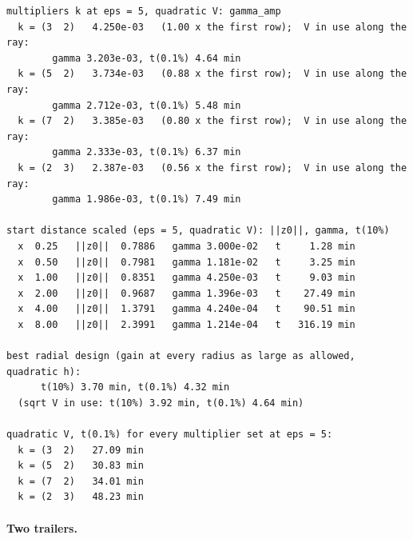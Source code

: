 {\begin{verbatim}
multipliers k at eps = 5, quadratic V: gamma_amp
  k = (3  2)   4.250e-03   (1.00 x the first row);  V in use along the ray:
        gamma 3.203e-03, t(0.1%) 4.64 min
  k = (5  2)   3.734e-03   (0.88 x the first row);  V in use along the ray:
        gamma 2.712e-03, t(0.1%) 5.48 min
  k = (7  2)   3.385e-03   (0.80 x the first row);  V in use along the ray:
        gamma 2.333e-03, t(0.1%) 6.37 min
  k = (2  3)   2.387e-03   (0.56 x the first row);  V in use along the ray:
        gamma 1.986e-03, t(0.1%) 7.49 min

start distance scaled (eps = 5, quadratic V): ||z0||, gamma, t(10%)
  x  0.25   ||z0||  0.7886   gamma 3.000e-02   t     1.28 min
  x  0.50   ||z0||  0.7981   gamma 1.181e-02   t     3.25 min
  x  1.00   ||z0||  0.8351   gamma 4.250e-03   t     9.03 min
  x  2.00   ||z0||  0.9687   gamma 1.396e-03   t    27.49 min
  x  4.00   ||z0||  1.3791   gamma 4.240e-04   t    90.51 min
  x  8.00   ||z0||  2.3991   gamma 1.214e-04   t   316.19 min

best radial design (gain at every radius as large as allowed, quadratic h):
      t(10%) 3.70 min, t(0.1%) 4.32 min
  (sqrt V in use: t(10%) 3.92 min, t(0.1%) 4.64 min)

quadratic V, t(0.1%) for every multiplier set at eps = 5:
  k = (3  2)   27.09 min
  k = (5  2)   30.83 min
  k = (7  2)   34.01 min
  k = (2  3)   48.23 min
\end{verbatim}}

\paragraph{Two trailers.}

